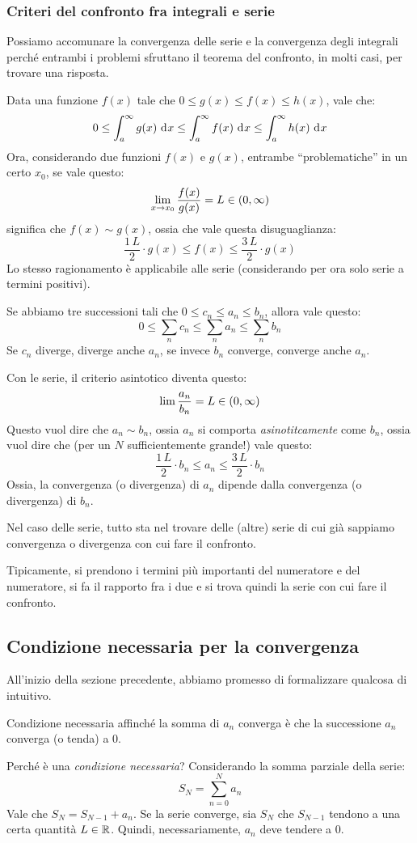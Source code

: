 \subsubsection{Criteri del confronto fra integrali e serie}

Possiamo accomunare la convergenza delle serie e la convergenza degli integrali perch\'e entrambi i problemi sfruttano il teorema del confronto, in molti casi, per trovare una risposta.

Data una funzione $f(x)$ tale che $0 \le g(x) \le f(x) \le h(x)$, vale che:
\[
0 \le \int_{a}^{\infty} g(x) \dx \le \int_{a}^{\infty} f(x) \dx \le \int_{a}^{\infty} h(x) \dx
\]
Ora, considerando due funzioni $f(x)$ e $g(x)$, entrambe ``problematiche'' in un certo $x_0$, se vale questo:
\[
\lim_{x \to x_0} \frac{f(x)}{g(x)} = L \in \ooint{0}{\infty}
\]
significa che $f(x) \sim g(x)$, ossia che vale questa disuguaglianza:
\[
\frac{1 \, L}{2} \cdot g(x) \le f(x) \le \frac{3 \, L}{2} \cdot g(x)
\]
Lo stesso ragionamento \`e applicabile alle serie (considerando per ora solo serie a termini positivi).

Se abbiamo tre successioni tali che $0 \le c_n \le a_n \le b_n$, allora vale questo:
\[
0 \le \sum_{n} c_n \le \sum_{n} a_n \le \sum_{n} b_n 
\]
Se $c_n$ diverge, diverge anche $a_n$, se invece $b_n$ converge, converge anche $a_n$.

Con le serie, il criterio asintotico diventa questo:
\[
\lim \frac{a_n}{b_n} = L \in \ooint{0}{\infty}
\]
Questo vuol dire che $a_n \sim b_n$, ossia $a_n$ si comporta \emph{asinotitcamente} come $b_n$, ossia vuol dire che (per un $N$ sufficientemente grande!) vale questo:
\[
\frac{1 \, L}{2} \cdot b_n \le a_n \le \frac{3 \, L}{2} \cdot b_n
\]
Ossia, la convergenza (o divergenza) di $a_n$ dipende dalla convergenza (o divergenza) di $b_n$.

Nel caso delle serie, tutto sta nel trovare delle (altre) serie di cui gi\`a sappiamo convergenza o divergenza con cui fare il confronto.

Tipicamente, si prendono i termini pi\`u importanti del numeratore e del numeratore, si fa il rapporto fra i due e si trova quindi la serie con cui fare il confronto.

\subsection{Condizione necessaria per la convergenza}

All'inizio della sezione precedente, abbiamo promesso di formalizzare qualcosa di intuitivo.
\begin{theorem}
Condizione necessaria affinch\'e la somma di $a_n$ converga \`e che la successione $a_n$ converga (o tenda) a 0.
\end{theorem}
Perch\'e \`e una \emph{condizione necessaria}? Considerando la somma parziale della serie:
\[
S_N = \sum_{n = 0}^{N} a_n
\]
Vale che $S_N = S_{N - 1} + a_n$. Se la serie converge, sia $S_N$ che $S_{N - 1}$ tendono a una certa quantit\`a $L \in \mathbb{R}$. Quindi, necessariamente, $a_n$ deve tendere a 0.

